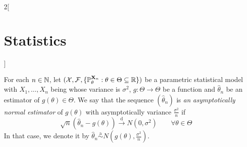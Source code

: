 \documentclass[../../../main_math.tex]{subfiles}
\begin{document}
\begin{multicols}{2}[\section{Statistics}]
\begin{definition}
  \end{definition}
  \begin{definition}
    For each $n\in\mathbb{N}$, let $(\mathcal{X},\mathcal{F},\{\mathbb{P}_{\theta}^{\boldsymbol{\mathrm{X}}_n}:\theta\in\Theta\subseteq \mathbb{R}\})$ be a parametric statistical model with $X_1,\ldots,X_n$ being \iid whose variance is $\sigma^2$, $g:\Theta\rightarrow\Theta$ be a function and ${{\hat\theta}}_n$ be an estimator of $g(\theta)\in\Theta$. We say that the sequence $({\hat\theta}_n)$ is \emph{an asymptotically normal estimator} of $g(\theta)$ with asymptotically variance $\frac{\sigma^2}{n}$ if $$\sqrt{n}({\hat\theta}_n-g(\theta))\overset{\text{d}}{\longrightarrow}N(0,\sigma^2)\qquad\forall \theta\in\Theta$$
    In that case, we denote it by ${\hat\theta}_n\overset{\text{a}}{\sim}N\left(g(\theta),\frac{\sigma^2}{n}\right)$.
  \end{definition}

\end{multicols}
\end{document}

